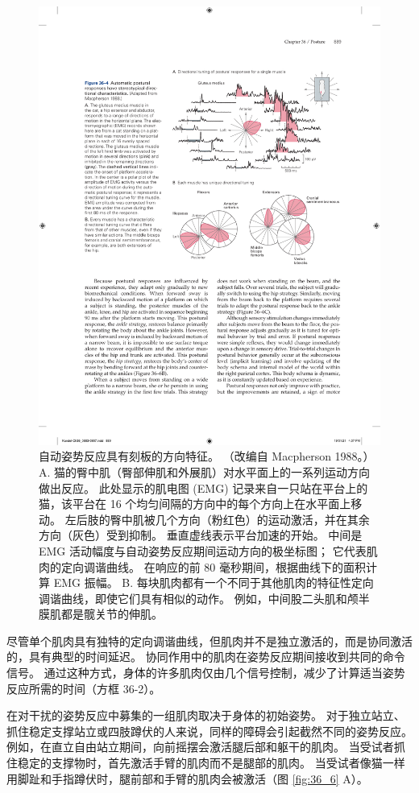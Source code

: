 \begin{figure}[htbp]
	\centering
	\includegraphics[width=0.7\linewidth]{chap36/fig_36_4}
	\caption{自动姿势反应具有刻板的方向特征。 （改编自 Macpherson 1988。） 
		A. 猫的臀中肌（臀部伸肌和外展肌）对水平面上的一系列运动方向做出反应。 
		此处显示的肌电图 (EMG) 记录来自一只站在平台上的猫，该平台在 16 个均匀间隔的方向中的每个方向上在水平面上移动。 
		左后肢的臀中肌被几个方向（粉红色）的运动激活，并在其余方向（灰色）受到抑制。 
		垂直虚线表示平台加速的开始。 
		中间是 EMG 活动幅度与自动姿势反应期间运动方向的极坐标图； 它代表肌肉的定向调谐曲线。 在响应的前 80 毫秒期间，根据曲线下的面积计算 EMG 振幅。 
		B. 每块肌肉都有一个不同于其他肌肉的特征性定向调谐曲线，即使它们具有相似的动作。 例如，中间股二头肌和颅半膜肌都是髋关节的伸肌。}
	\label{fig:36_4}
\end{figure}


尽管单个肌肉具有独特的定向调谐曲线，但肌肉并不是独立激活的，而是协同激活的，具有典型的时间延迟。
协同作用中的肌肉在姿势反应期间接收到共同的命令信号。
通过这种方式，身体的许多肌肉仅由几个信号控制，减少了计算适当姿势反应所需的时间（方框 36-2）。


在对干扰的姿势反应中募集的一组肌肉取决于身体的初始姿势。
对于独立站立、抓住稳定支撑站立或四肢蹲伏的人来说，同样的障碍会引起截然不同的姿势反应。
例如，在直立自由站立期间，向前摇摆会激活腿后部和躯干的肌肉。
当受试者抓住稳定的支撑物时，首先激活手臂的肌肉而不是腿部的肌肉。
当受试者像猫一样用脚趾和手指蹲伏时，腿前部和手臂的肌肉会被激活（图 \ref{fig:36_6} A）。


